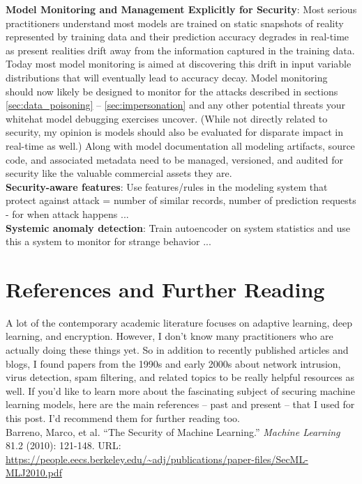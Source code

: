 \documentclass[fleqn]{article}
\begin{document}
\noindent\textbf{Model Monitoring and Management Explicitly for Security}: Most serious practitioners understand most models are trained on static snapshots of reality represented by training data and their prediction accuracy degrades in real-time as present realities drift away from the information captured in the training data. Today most model monitoring is aimed at discovering this drift in input variable distributions that will eventually lead to accuracy decay. Model monitoring should now likely be designed to monitor for the attacks described in sections  \ref{sec:data_poisoning} -- \ref{sec:impersonation} and any other potential threats your whitehat model debugging exercises uncover. (While not directly related to security, my opinion is models should also be evaluated for disparate impact in real-time as well.) Along with model documentation all modeling artifacts, source code, and associated metadata need to be managed, versioned, and audited for security like the valuable commercial assets they are.\\

\noindent\textbf{Security-aware features}: Use features/rules in the modeling system that protect against attack = number of similar records, number of prediction requests - for when attack happens ...\\

\noindent\textbf{Systemic anomaly detection}: Train autoencoder on system statistics and use this a system to monitor for strange behavior ...\\ 

\section{References and Further Reading} \label{sec:ref}

A lot of the contemporary academic literature focuses on adaptive learning, deep learning, and encryption. However, I don't know many practitioners who are actually doing these things yet. So in addition to recently published articles and blogs, I found papers from the 1990s and early 2000s about network intrusion, virus detection, spam filtering, and related topics to be really helpful resources as well. If you'd like to learn more about the fascinating subject of securing machine learning models, here are the main references -- past and present -- that I used for this post. I'd recommend them for further reading too.\\

\noindent Barreno, Marco, et al. ``The Security of Machine Learning.'' \textit{Machine Learning} 81.2 (2010): 121-148. URL: \url{https://people.eecs.berkeley.edu/~adj/publications/paper-files/SecML-MLJ2010.pdf}\\
\end{document}
